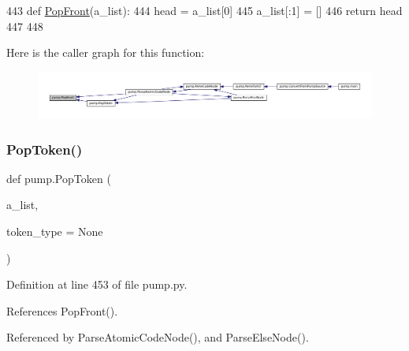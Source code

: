 \begin{DoxyCode}
443 \textcolor{keyword}{def }\hyperlink{namespacepump_a8e2ff118da88397e88ccf68ebcd2df79}{PopFront}(a\_list):
444   head = a\_list[0]
445   a\_list[:1] = []
446   \textcolor{keywordflow}{return} head
447 
448 
\end{DoxyCode}
Here is the caller graph for this function\+:
\nopagebreak
\begin{figure}[H]
\begin{center}
\leavevmode
\includegraphics[width=350pt]{namespacepump_a8e2ff118da88397e88ccf68ebcd2df79_icgraph}
\end{center}
\end{figure}
\mbox{\label{namespacepump_a45e1d5d5c1c188fc53eee8bd1e00e6b0}} 
\subsubsection{\texorpdfstring{Pop\+Token()}{PopToken()}}
{\footnotesize\ttfamily def pump.\+Pop\+Token (\begin{DoxyParamCaption}\item[{}]{a\+\_\+list,  }\item[{}]{token\+\_\+type = {\ttfamily None} }\end{DoxyParamCaption})}



Definition at line 453 of file pump.\+py.



References Pop\+Front().



Referenced by Parse\+Atomic\+Code\+Node(), and Parse\+Else\+Node().


